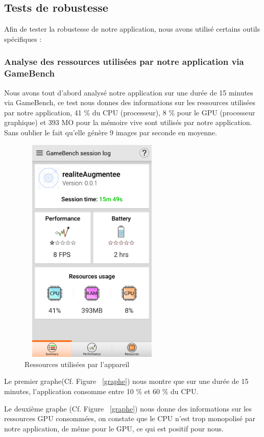 \documentclass[12pt,a4paper]{article}
\begin{document}
\subsection{Tests de robustesse}
Afin de tester la robustesse de notre application, nous avons utilisé certains outils spécifiques :
\subsubsection{Analyse des ressources utilisées par notre application via GameBench}
Nous avons tout d'abord analysé notre application sur une durée de 15 minutes via GameBench, ce test nous donnes des informations sur les ressources utilisées par notre application, 41 \% du CPU (processeur), 8 \% pour le GPU (processeur graphique) et 393 MO pour la mémoire vive sont utilisés par notre application. Sans oublier le fait qu'elle génère 9 images par seconde en moyenne.\par  
\begin{figure}[ht]
  \centering
    \includegraphics[width = 7cm,height=11cm]{test_gamebench_1.png}
     \caption{Ressources utilisées par l'appareil 
      }
      \label{premi_graphe}
\end{figure}
Le premier graphe(Cf. Figure ~\ref{graphe})  nous montre que sur une durée de 15 minutes, l'application consomme entre 10 \% et 60 \% du CPU.\par 
Le deuxième graphe (Cf. Figure ~\ref{graphe}) nous donne des informations sur les ressources GPU consommées, on constate que le CPU n'est trop monopolisé par notre application, de même pour le GPU, ce qui est positif pour nous.\par 
\end{document}

